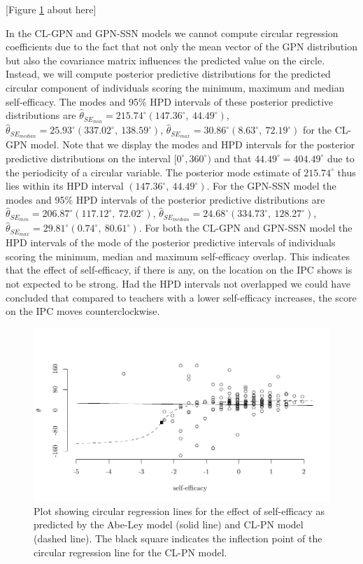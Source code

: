 \documentclass[man,mask]{apa6}
\begin{document}
\hfil [Figure \ref{regline} about here] \hfil

\indent In the CL-GPN and GPN-SSN models we cannot compute circular regression
coefficients due to the fact that not only the mean vector of the GPN
distribution but also the covariance matrix influences the predicted value on
the circle. Instead, we will compute posterior predictive distributions for the
predicted circular component of individuals scoring the minimum, maximum and
median self-efficacy. The modes and 95\% HPD intervals of these posterior
predictive distributions are \(\hat{\theta}_{SE_{min}} = 215.74^\circ (147.36^\circ, \: 44.49^\circ)\), \(\hat{\theta}_{SE_{median}} = 25.93^\circ (337.02^\circ, \: 138.59^\circ)\), \(\hat{\theta}_{SE_{max}} = 30.86^\circ (8.63^\circ, \: 72.19^\circ)\) for the CL-GPN model. Note that we display the
modes and HPD intervals for the posterior predictive distributions on the
interval \([0^\circ, 360^\circ)\) and that \(44.49^\circ = 404.49^\circ\) due to the
periodicity of a circular variable. The posterior mode estimate of
\(215.74^\circ\) thus lies within its HPD interval \((147.36^\circ, \: 44.49^\circ)\). For the GPN-SSN model the modes and 95\% HPD intervals of the
posterior predictive distributions are \(\hat{\theta}_{SE_{min}} = 206.87^\circ (117.12^\circ, \: 72.02^\circ)\), \(\hat{\theta}_{SE_{median}} = 24.68^\circ (334.73^\circ, \: 128.27^\circ)\), \(\hat{\theta}_{SE_{max}} = 29.81^\circ (0.74^\circ, \: 80.61^\circ)\). For both the CL-GPN and GPN-SSN model the HPD
intervals of the mode of the posterior predictive intervals of individuals
scoring the minimum, median and maximum self-efficacy overlap. This indicates
that the effect of self-efficacy, if there is any, on the location on the IPC shows is not expected to be strong. Had the HPD intervals not
overlapped we could have concluded that compared to teachers with a lower self-efficacy increases, the
score on the IPC moves counterclockwise.

\begin{figure}
\centering
\includegraphics[width = \textwidth]{Plots/reglinediffSE.pdf}
\caption{Plot showing circular regression lines for the effect of self-efficacy
as predicted by the Abe-Ley model (solid line) and CL-PN model (dashed line). The
black square indicates the inflection point of the circular regression line for
the CL-PN model.}
\label{regline}
\end{figure}
\end{document}
